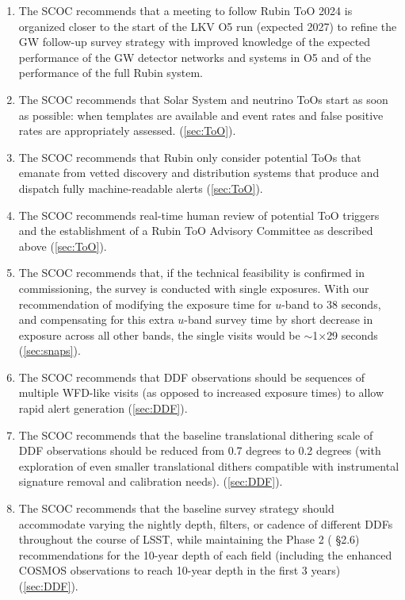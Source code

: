 \begin{enumerate}
\item The SCOC recommends that a meeting to follow Rubin ToO 2024 is organized closer to the start of the LKV O5 run (expected 2027) to refine the GW follow-up survey strategy with improved knowledge of the expected performance of the GW detector networks and systems in O5 and of the performance of the full Rubin system. 

\item The SCOC recommends that Solar System and neutrino ToOs start as soon as possible: when templates are available and event rates and false positive rates are appropriately assessed. (\autoref{sec:ToO}).

\item The SCOC recommends that Rubin only consider potential ToOs that emanate from vetted discovery and distribution systems that produce and dispatch fully machine-readable alerts (\autoref{sec:ToO}).

\item The SCOC recommends real-time human review of potential ToO triggers and the establishment of a Rubin ToO Advisory Committee as described above (\autoref{sec:ToO}).

\item The SCOC recommends that, if the technical feasibility is confirmed in commissioning, the survey is conducted with single exposures. With our recommendation of modifying the exposure time for $u$-band to 38 seconds, and compensating for this extra $u$-band survey time by short decrease in exposure across all other bands, the single visits would be \mbox{$\sim$1$\times$29} seconds (\autoref{sec:snaps}).

\item The SCOC recommends that DDF observations should be sequences of multiple WFD-like visits (as opposed to increased exposure times) to allow rapid alert generation (\autoref{sec:DDF}).

\item The SCOC recommends that the baseline translational dithering scale of DDF observations should be reduced from 0.7 degrees to 0.2 degrees (with exploration of even smaller translational dithers compatible with instrumental signature removal and calibration needs). (\autoref{sec:DDF}).

\item The SCOC recommends that the baseline survey strategy should accommodate varying the nightly depth, filters, or cadence of different DDFs throughout the course of LSST, while maintaining the Phase 2 ( \S2.6) recommendations for the 10-year depth of each field (including the enhanced COSMOS observations to reach 10-year depth in the first 3 years) (\autoref{sec:DDF}).


\end{enumerate}
